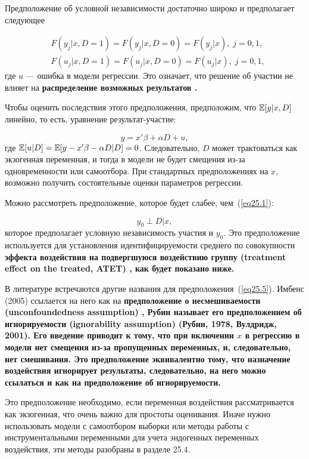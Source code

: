 Предположение об условной независимости достаточно широко и предполагает следующее 


\begin{align}
\label{eq25.3}
& F(y_j | x, D = 1) = F(y_j | x, D = 0) = F(y_j | x), \; j = 0,1 ,  \\
& F(u_j | x, D = 1) = F(u_j | x, D = 0) = F(u_j | x), \; j = 0,1, \nonumber
\end{align}
где $u$ --- ошибка в модели регрессии. Это означает, что решение об участии не влияет на \bfseries распределение возможных результатов \mdseries. 

Чтобы оценить последствия этого предположения, предположим, что $\mathbb{E}[y|x, D]$ линейно, то есть, уравнение результат-участие:

\begin{equation}
\label{eq25.4}
y = x' \beta + \alpha D + u, 
\end{equation}
где $\mathbb{E}[u|D] = \mathbb{E} [y - x' \beta - \alpha D | D] = 0$. Следовательно, $D$ может трактоваться как экзогенная переменная, и тогда в модели не будет смещения из-за одновременности или самоотбора. При стандартных предположениях на $x$, возможно получить состоятельные оценки параметров регрессии. 

Можно рассмотреть предположение, которое будет слабее, чем~(\ref{eq25.1}):

\begin{equation}
\label{eq25.5}
y_0 \perp D | x,
\end{equation}
которое предполагает условную независимость участия и $y_0$. Это предположение используется для установления идентифицируемости среднего по совокупности \bfseries эффекта воздействия на подвергшуюся воздействию группу (treatment effect on the treated, ATET) \mdseries, как будет показано ниже. 

В литературе встречаются другие названия для предположения~(\ref{eq25.5}). Имбенс (2005) ссылается на него как на \bfseries предположение о несмешиваемости (unconfoundedness assumption) \mdseries, Рубин называет его \bfseries предположением об игнорируемости (ignorability assumption) \mdseries (Рубин, 1978, Вулдридж, 2001). Его введение приводит к тому, что при включении $x$ в регрессию в модели нет смещения из-за пропущенных переменных, и, следовательно, нет смешивания. Это предположение эквивалентно тому, что назначение воздействия игнорирует результаты, следовательно, на него можно ссылаться и как на предположение об игнорируемости. 

Это предположение необходимо, если переменная воздействия рассматривается как экзогенная, что очень важно для простоты оценивания. Иначе нужно использовать модели с самоотбором выборки или методы работы с инструментальными переменными для учета эндогенных переменных воздействия, эти методы разобраны в разделе 25.4. 

